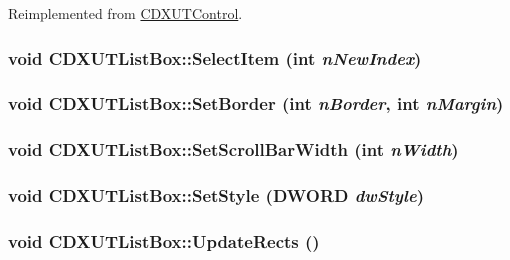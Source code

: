 Reimplemented from \hyperlink{class_c_d_x_u_t_control_afd92fa04241f66fdbf207bc5870c9388}{CDXUTControl}.\hypertarget{class_c_d_x_u_t_list_box_a9951c0e995690bf7821b70c447d49bed}{
\subsubsection[{SelectItem}]{\setlength{\rightskip}{0pt plus 5cm}void CDXUTListBox::SelectItem ({\bf int} {\em nNewIndex})}}
\label{class_c_d_x_u_t_list_box_a9951c0e995690bf7821b70c447d49bed}
\hypertarget{class_c_d_x_u_t_list_box_a9886ec7b003a9c218a6b5684d3cc0530}{
\subsubsection[{SetBorder}]{\setlength{\rightskip}{0pt plus 5cm}void CDXUTListBox::SetBorder ({\bf int} {\em nBorder}, \/  {\bf int} {\em nMargin})}}
\label{class_c_d_x_u_t_list_box_a9886ec7b003a9c218a6b5684d3cc0530}
\hypertarget{class_c_d_x_u_t_list_box_a21b4a1c70d8b5fc213760927b9ae5c1d}{
\subsubsection[{SetScrollBarWidth}]{\setlength{\rightskip}{0pt plus 5cm}void CDXUTListBox::SetScrollBarWidth ({\bf int} {\em nWidth})}}
\label{class_c_d_x_u_t_list_box_a21b4a1c70d8b5fc213760927b9ae5c1d}
\hypertarget{class_c_d_x_u_t_list_box_aabaa331fd9dfac04ba655a369d1cef0e}{
\subsubsection[{SetStyle}]{\setlength{\rightskip}{0pt plus 5cm}void CDXUTListBox::SetStyle (DWORD {\em dwStyle})}}
\label{class_c_d_x_u_t_list_box_aabaa331fd9dfac04ba655a369d1cef0e}
\hypertarget{class_c_d_x_u_t_list_box_a295c60c194d1126086d26bad65a17efc}{
\subsubsection[{UpdateRects}]{\setlength{\rightskip}{0pt plus 5cm}void CDXUTListBox::UpdateRects ()}}
\label{class_c_d_x_u_t_list_box_a295c60c194d1126086d26bad65a17efc}


